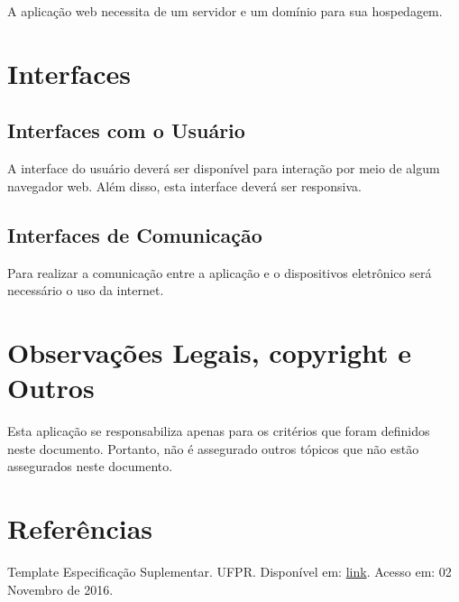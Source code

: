 \begin{apendicesenv}
A aplicação web necessita de um servidor e um domínio para sua hospedagem.\\

{\large {\section { Interfaces \\ } } }

{\subsection {Interfaces com o Usuário\\ }}

A interface do usuário deverá ser disponível para interação por meio de algum navegador web. Além disso, esta interface deverá ser responsiva.\\

{\subsection {Interfaces de Comunicação\\ }}

Para realizar a comunicação entre a aplicação e o dispositivos eletrônico será necessário o uso da internet.\\

{\large {\section { Observações Legais, copyright e Outros  \\ } } }

Esta aplicação se responsabiliza apenas para os critérios que foram definidos neste documento. Portanto, não é assegurado outros tópicos que não estão assegurados neste documento. \\

{\large {\section { Referências \\ } } }

Template Especificação Suplementar. UFPR. Disponível em: \href{http://www.funpar.ufpr.br:8080/rup/webtmpl/templates/req/rup_sspec.htm}{link}. Acesso em: 02 Novembro de 2016.\\

\end{apendicesenv}

